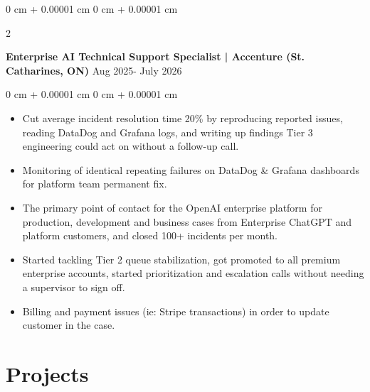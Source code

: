 \documentclass[10pt, letterpaper]{article}
\newenvironment{highlights}{
    \begin{itemize}[
        topsep=0.10 cm,
        parsep=0.10 cm,
        partopsep=0pt,
        itemsep=0pt,
        leftmargin=0 cm + 10pt
    ]
}{
    \end{itemize}
} %
\newenvironment{onecolentry}{
    \begin{adjustwidth}{
        0 cm + 0.00001 cm
    }{
        0 cm + 0.00001 cm
    }
}{
    \end{adjustwidth}
} %
\newenvironment{twocolentry}[2][]{
    \onecolentry
    \def\secondColumn{#2}
    \setcolumnwidth{\fill, 4.5 cm}
    \begin{paracol}{2}
}{
    \switchcolumn \raggedleft \secondColumn
    \end{paracol}
    \endonecolentry
} %
\begin{document}
        \begin{twocolentry}{
            {Aug 2025- July 2026}
        }
            \textbf{Enterprise AI Technical Support Specialist | Accenture (St. Catharines, ON)}\end{twocolentry}
        \vspace{0.10 cm}
        \begin{onecolentry}
            \begin{highlights}
                \item Cut average incident resolution time 20\% by reproducing reported issues, reading DataDog and Grafana logs, and writing up findings Tier 3 engineering could act on without a follow-up call.
                \item Monitoring of identical repeating failures on DataDog \& Grafana dashboards for platform team permanent fix.
                \item The primary point of contact for the OpenAI enterprise platform for production, development and business cases from Enterprise ChatGPT and platform customers, and closed 100+ incidents per month.
                \item Started tackling Tier 2 queue stabilization, got promoted to all premium enterprise accounts, started prioritization and escalation calls without needing a supervisor to sign off.
                \item Billing and payment issues (ie: Stripe transactions) in order to update customer in the case.
            \end{highlights}
        \end{onecolentry}

    \section{Projects}
\end{document}
